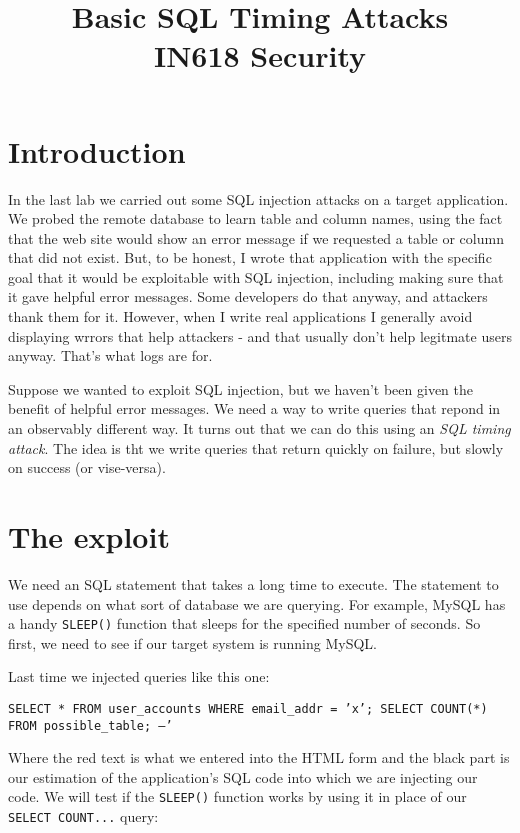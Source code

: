 \documentclass{article}
\begin{document}
\title{Basic SQL Timing Attacks\\ IN618 Security}
\date{}
\maketitle

\section*{Introduction}
In the last lab we carried out some SQL injection attacks on a target application.  We probed the remote database to learn table and column names, using the fact that the web site would show an error message if we requested a table or column that did not exist. But, to be honest, I wrote that application with the specific goal that it would be exploitable with SQL injection, including making sure that it gave helpful error messages. Some developers do that anyway, and attackers thank them for it. However, when I write real applications I generally avoid displaying wrrors that help attackers - and that usually don't help legitmate users anyway.  That's what logs are for. 

Suppose we wanted to exploit SQL injection, but we haven't been given the benefit of helpful error messages.  We need a way to write queries that repond in an observably different way. It turns out that we can do this using an \emph{SQL timing attack}. The idea is tht we write queries that return quickly on failure, but slowly on success (or vise-versa).


\section{The exploit}
We need an SQL statement that takes a long time to execute.  The statement to use depends on what sort of database we are querying. For example, MySQL has a handy \texttt{SLEEP()} function that sleeps for the specified number of seconds. So first, we need to see if our target system is running MySQL.

Last time we injected queries like this one:

\texttt{SELECT * FROM user\_accounts WHERE email\_addr = '{\color{red}x'; SELECT COUNT(*) FROM possible\_table; --}' }

Where the red text is what we entered into the HTML form and the black part is our estimation of the application's SQL code into which we are injecting our code. We will test if the \texttt{SLEEP()} function works by using it in place of our \texttt{SELECT COUNT...} query:
\end{document}
